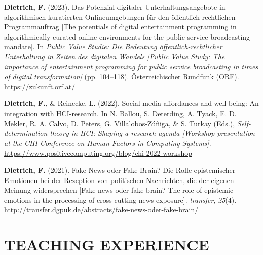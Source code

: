 \documentclass[11pt,a4paper,]{awesome-cv}
\newlength{\cslhangindent}
\newenvironment{CSLReferences}[2] %
 {\begin{list}{}{%
  \setlength{\itemindent}{0pt}
  \setlength{\leftmargin}{0pt}
  \setlength{\parsep}{0pt}
  \ifodd #1
   \setlength{\leftmargin}{\cslhangindent}
   \setlength{\itemindent}{-1\cslhangindent}
  \fi
  \setlength{\itemsep}{#2\baselineskip}}}
 {\end{list}}
\begin{document}
\label{refs-1ad97b12bb8b22e86e46411237317ecb}
\begin{CSLReferences}{1}{0}
\textbf{Dietrich, F.} (2023). Das Potenzial digitaler
Unterhaltungsangebote in algorithmisch kuratierten Onlineumgebungen für
den öffentlich-rechtlichen Programmauftrag {[}The potentials of digital
entertainment programming in algorithmically curated online environments
for the public service broadcasting mandate{]}. In \emph{Public Value
Studie: Die Bedeutung öffentlich-rechtlicher Unterhaltung in Zeiten des
digitalen Wandels {[}Public Value Study: The importance of entertainment
programming for public service broadcasting in times of digital
transformation{]}} (pp. 104--118). Österreichischer Rundfunk (ORF).
\url{https://zukunft.orf.at/}

\textbf{Dietrich, F.}, \& Reinecke, L. (2022). Social media affordances
and well-being: An integration with HCI-research. In N. Ballou, S.
Deterding, A. Tyack, E. D. Mekler, R. A. Calvo, D. Peters, G.
Villalobos-Zúñiga, \& S. Turkay (Eds.), \emph{Self-determination theory
in HCI: Shaping a research agenda {[}Workshop presentation at the CHI
Conference on Human Factors in Computing Systems{]}}.
\url{https://www.positivecomputing.org/blog/chi-2022-workshop}

\textbf{Dietrich, F.} (2021). Fake News oder Fake Brain? Die Rolle
epistemischer Emotionen bei der Rezeption von politischen Nachrichten,
die der eigenen Meinung widersprechen {[}Fake news oder fake brain? The
role of epistemic emotions in the processing of cross-cutting news
exposure{]}. \emph{transfer}, \emph{25}(4).
\url{http://transfer.dgpuk.de/abstracts/fake-news-oder-fake-brain/}

\end{CSLReferences}

\endgroup

\section{TEACHING EXPERIENCE}\label{teaching-experience}
\end{document}
